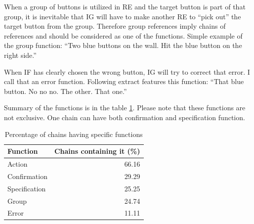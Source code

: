 When a group of buttons is utilized in RE and the target button is part of that group, it is inevitable that IG will have to make another RE to ``pick out'' the target button from the group. Therefore group references imply chains of references and should be considered as one of the functions. Simple example of the group function: ``Two blue buttons on the wall. Hit the blue button on the right side.''

When IF has clearly chosen the wrong button, IG will try to correct that error. I call that an error function. Following extract features this function: ``That blue button. No no no. The other. That one.''

Summary of the functions is in the table \ref{tab:chains-functions}. Please note that these functions are not exclusive. One chain can have both confirmation and specification function.

\begin{table}[h!]
\centering
\begin{tabular}{lr}
\toprule
Function   & Chains containing it (\%)  \\
\midrule
Action    		& 66.16\\
Confirmation	 	& 29.29\\
Specification 	& 25.25\\
Group 	  		& 24.74\\
Error 			& 11.11\\
\bottomrule
\end{tabular}
\caption{Percentage of chains having specific functions}
\label{tab:chains-functions}
\end{table}



